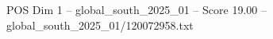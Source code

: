 \begin{textsample}{POS Dim 1 – global\_south\_2025\_01 – Score 19.00 – global\_south\_2025\_01/120072958.txt}
\end{textsample}
